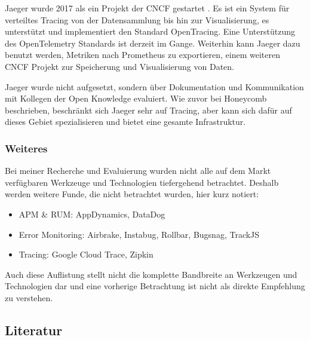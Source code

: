 Jaeger wurde 2017 als ein Projekt der CNCF gestartet \cite{Jaeger}. Es ist ein System für verteiltes Tracing von der Datensammlung bis hin zur Visualisierung, es unterstützt und implementiert den Standard OpenTracing.  Eine Unterstützung des OpenTelemetry Standards ist derzeit im Gange. Weiterhin kann Jaeger dazu benutzt werden, Metriken nach Prometheus \cite{Prometheus} zu exportieren, einem weiteren CNCF Projekt zur Speicherung und Visualisierung von Daten.

Jaeger wurde nicht aufgesetzt, sondern über Dokumentation und Kommunikation mit Kollegen der Open Knowledge evaluiert. Wie zuvor bei Honeycomb beschrieben, beschränkt sich Jaeger sehr auf Tracing, aber kann sich dafür auf dieses Gebiet spezialisieren und bietet eine gesamte Infrastruktur.

\subsubsection{Weiteres}

Bei meiner Recherche und Evaluierung wurden nicht alle auf dem Markt verfügbaren Werkzeuge und Technologien tiefergehend betrachtet. Deshalb werden weitere Funde, die nicht betrachtet wurden, hier kurz notiert:

\begin{itemize}
	\item APM \& RUM: AppDynamics, DataDog
	\item Error Monitoring: Airbrake, Instabug, Rollbar, Bugsnag, TrackJS
	\item Tracing: Google Cloud Trace, Zipkin
\end{itemize}

Auch diese Auflistung stellt nicht die komplette Bandbreite an Werkzeugen und Technologien dar und eine vorherige Betrachtung ist nicht als direkte Empfehlung zu verstehen.

\subsection{Literatur}